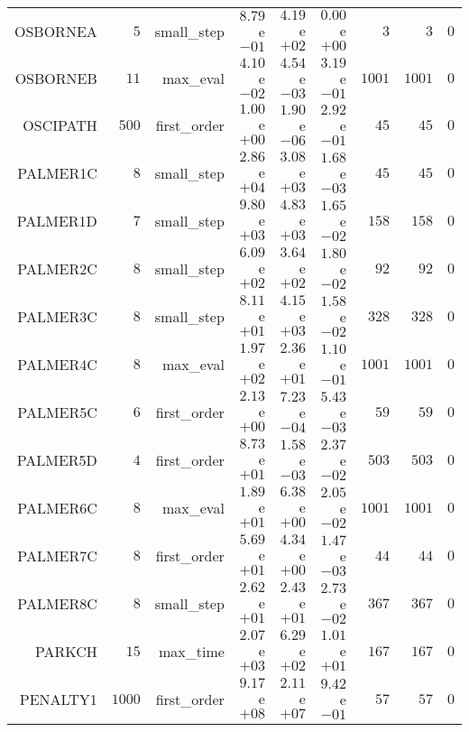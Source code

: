 \begin{longtable}{rrrrrrrrr}
OSBORNEA & \(     5\) & small\_step & \( 8.79\)e\(-01\) & \( 4.19\)e\(+02\) & \( 0.00\)e\(+00\) & \(     3\) & \(     3\) & \(     0\) \\
OSBORNEB & \(    11\) & max\_eval & \( 4.10\)e\(-02\) & \( 4.54\)e\(-03\) & \( 3.19\)e\(-01\) & \(  1001\) & \(  1001\) & \(     0\) \\
OSCIPATH & \(   500\) & first\_order & \( 1.00\)e\(+00\) & \( 1.90\)e\(-06\) & \( 2.92\)e\(-01\) & \(    45\) & \(    45\) & \(     0\) \\
PALMER1C & \(     8\) & small\_step & \( 2.86\)e\(+04\) & \( 3.08\)e\(+03\) & \( 1.68\)e\(-03\) & \(    45\) & \(    45\) & \(     0\) \\
PALMER1D & \(     7\) & small\_step & \( 9.80\)e\(+03\) & \( 4.83\)e\(+03\) & \( 1.65\)e\(-02\) & \(   158\) & \(   158\) & \(     0\) \\
PALMER2C & \(     8\) & small\_step & \( 6.09\)e\(+02\) & \( 3.64\)e\(+02\) & \( 1.80\)e\(-02\) & \(    92\) & \(    92\) & \(     0\) \\
PALMER3C & \(     8\) & small\_step & \( 8.11\)e\(+01\) & \( 4.15\)e\(+03\) & \( 1.58\)e\(-02\) & \(   328\) & \(   328\) & \(     0\) \\
PALMER4C & \(     8\) & max\_eval & \( 1.97\)e\(+02\) & \( 2.36\)e\(+01\) & \( 1.10\)e\(-01\) & \(  1001\) & \(  1001\) & \(     0\) \\
PALMER5C & \(     6\) & first\_order & \( 2.13\)e\(+00\) & \( 7.23\)e\(-04\) & \( 5.43\)e\(-03\) & \(    59\) & \(    59\) & \(     0\) \\
PALMER5D & \(     4\) & first\_order & \( 8.73\)e\(+01\) & \( 1.58\)e\(-03\) & \( 2.37\)e\(-02\) & \(   503\) & \(   503\) & \(     0\) \\
PALMER6C & \(     8\) & max\_eval & \( 1.89\)e\(+01\) & \( 6.38\)e\(+00\) & \( 2.05\)e\(-02\) & \(  1001\) & \(  1001\) & \(     0\) \\
PALMER7C & \(     8\) & first\_order & \( 5.69\)e\(+01\) & \( 4.34\)e\(+00\) & \( 1.47\)e\(-03\) & \(    44\) & \(    44\) & \(     0\) \\
PALMER8C & \(     8\) & small\_step & \( 2.62\)e\(+01\) & \( 2.43\)e\(+01\) & \( 2.73\)e\(-02\) & \(   367\) & \(   367\) & \(     0\) \\
PARKCH & \(    15\) & max\_time & \( 2.07\)e\(+03\) & \( 6.29\)e\(+02\) & \( 1.01\)e\(+01\) & \(   167\) & \(   167\) & \(     0\) \\
PENALTY1 & \(  1000\) & first\_order & \( 9.17\)e\(+08\) & \( 2.11\)e\(+07\) & \( 9.42\)e\(-01\) & \(    57\) & \(    57\) & \(     0\) \\

\end{longtable}

